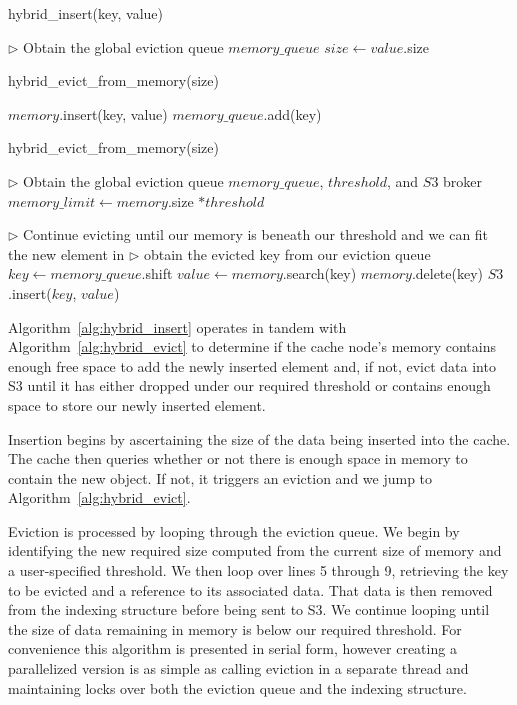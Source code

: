 \begin{algorithm}[htp]
\small
\caption{\label{alg:hybrid_insert}hybrid\_insert(key, value)}
\begin{algorithmic}[1]
\STATE $\triangleright$ Obtain the global eviction queue $memory\_queue$
\STATE $size \leftarrow value$.size

  \STATE hybrid\_evict\_from\_memory(size)
\ENDIF

\STATE $memory$.insert(key, value)
\STATE $memory\_queue$.add(key)
\end{algorithmic}
\end{algorithm}

\begin{algorithm}[htp]
\small
\caption{\label{alg:hybrid_evict}hybrid\_evict\_from\_memory(size)}
\begin{algorithmic}[1]
\STATE $\triangleright$ Obtain the global eviction queue $memory\_queue$,
$threshold$, and $S3$ broker
\STATE $memory\_limit \leftarrow memory$.size $* threshold$

\STATE $\triangleright$ Continue evicting until our memory is beneath our
threshold and we can fit the new element in
  \STATE $\triangleright$ obtain the evicted key from our eviction queue
  \STATE $key \leftarrow memory\_queue$.shift
  \STATE $value \leftarrow memory$.search(key)
  \STATE $memory$.delete(key)
  \STATE $S3$.insert($key$, $value$)
\ENDWHILE
\end{algorithmic}
\end{algorithm}

Algorithm~\ref{alg:hybrid_insert} operates in tandem with
Algorithm~\ref{alg:hybrid_evict} to determine if the cache node's memory
contains enough free space to add the newly inserted element and, if not, evict
data into S3 until it has either dropped under our required threshold or
contains enough space to store our newly inserted element.

Insertion begins by ascertaining the size of the data being inserted into the
cache. The cache then queries whether or not there is enough space in memory to
contain the new object. If not, it triggers an eviction and we jump to
Algorithm~\ref{alg:hybrid_evict}.

Eviction is processed by looping through the eviction queue. We begin by
identifying the new required size computed from the current size of memory and
a user-specified threshold. We then loop over lines 5 through 9, retrieving the
key to be evicted and a reference to its associated data. That data is then
removed from the indexing structure before being sent to S3. We continue
looping until the size of data remaining in memory is below our required
threshold. For convenience this algorithm is presented in serial form, however
creating a parallelized version is as simple as calling eviction in a separate
thread and maintaining locks over both the eviction queue and the indexing
structure.

